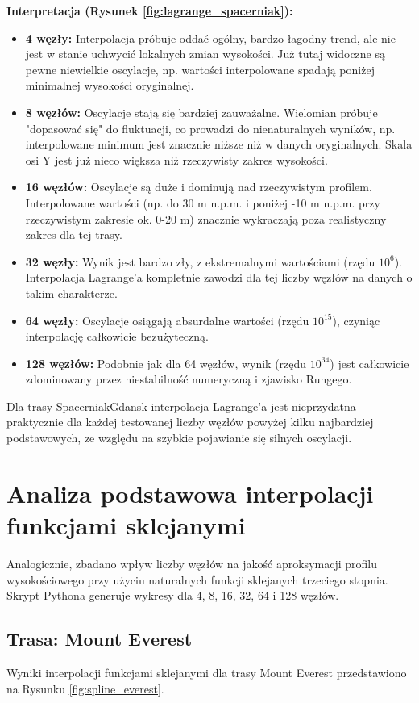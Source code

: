 \documentclass[11pt,a4paper]{article}
\begin{document}
\textbf{Interpretacja (Rysunek \ref{fig:lagrange_spacerniak}):} 
\begin{itemize}
    \item \textbf{4 węzły:} Interpolacja próbuje oddać ogólny, bardzo łagodny trend, ale nie jest w stanie uchwycić lokalnych zmian wysokości. Już tutaj widoczne są pewne niewielkie oscylacje, np. wartości interpolowane spadają poniżej minimalnej wysokości oryginalnej.
    \item \textbf{8 węzłów:} Oscylacje stają się bardziej zauważalne. Wielomian próbuje "dopasować się" do fluktuacji, co prowadzi do nienaturalnych wyników, np. interpolowane minimum jest znacznie niższe niż w danych oryginalnych. Skala osi Y jest już nieco większa niż rzeczywisty zakres wysokości.
    \item \textbf{16 węzłów:} Oscylacje są duże i dominują nad rzeczywistym profilem. Interpolowane wartości (np. do 30 m n.p.m. i poniżej -10 m n.p.m. przy rzeczywistym zakresie ok. 0-20 m) znacznie wykraczają poza realistyczny zakres dla tej trasy.
    \item \textbf{32 węzły:} Wynik jest bardzo zły, z ekstremalnymi wartościami (rzędu $10^6$). Interpolacja Lagrange'a kompletnie zawodzi dla tej liczby węzłów na danych o takim charakterze.
    \item \textbf{64 węzły:} Oscylacje osiągają absurdalne wartości (rzędu $10^{15}$), czyniąc interpolację całkowicie bezużyteczną.
    \item \textbf{128 węzłów:} Podobnie jak dla 64 węzłów, wynik (rzędu $10^{34}$) jest całkowicie zdominowany przez niestabilność numeryczną i zjawisko Rungego.
\end{itemize}
Dla trasy SpacerniakGdansk interpolacja Lagrange'a jest nieprzydatna praktycznie dla każdej testowanej liczby węzłów powyżej kilku najbardziej podstawowych, ze względu na szybkie pojawianie się silnych oscylacji.

\section{Analiza podstawowa interpolacji funkcjami sklejanymi}
\label{sec:analiza_spline}
Analogicznie, zbadano wpływ liczby węzłów na jakość aproksymacji profilu wysokościowego przy użyciu naturalnych funkcji sklejanych trzeciego stopnia. Skrypt Pythona generuje wykresy dla 4, 8, 16, 32, 64 i 128 węzłów.

\subsection{Trasa: Mount Everest}
Wyniki interpolacji funkcjami sklejanymi dla trasy Mount Everest przedstawiono na Rysunku \ref{fig:spline_everest}.
\end{document}
